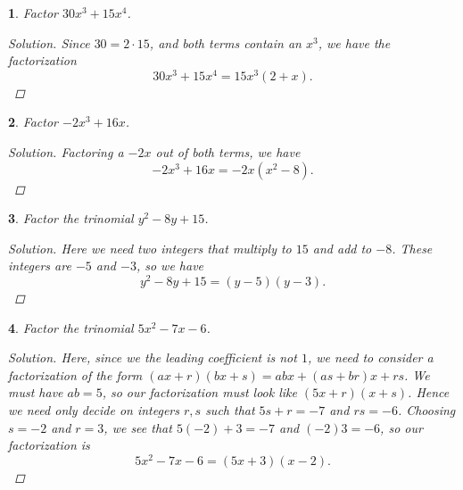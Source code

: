 \documentclass[12pt]{amsart}
\newtheorem{thm}{}
\begin{document}
\setcounter{thm}{6}
\begin{thm}
  Factor $30x^3 + 15x^4$.
  
  \begin{proof}[Solution]
    Since $30 = 2\cdot 15$, and both terms contain an $x^3$, we have the factorization
    $$30x^3 + 15x^4 = 15x^3(2 + x).$$
  \end{proof}
\end{thm}

\setcounter{thm}{8}
\begin{thm}
  Factor $-2x^3 + 16x$.
  
  \begin{proof}[Solution]
    Factoring a $-2x$ out of both terms, we have
    $$-2x^3 + 16x = -2x(x^2 - 8).$$
  \end{proof}
\end{thm}

\setcounter{thm}{20}
\begin{thm}
  Factor the trinomial $y^2 - 8y + 15$.
  
  \begin{proof}[Solution]
    Here we need two integers that multiply to $15$ and add to $-8$.
    These integers are $-5$ and $-3$, so we have
    $$y^2 - 8y + 15 = (y - 5)(y - 3).$$
  \end{proof}
\end{thm}

\setcounter{thm}{24}
\begin{thm}
  Factor the trinomial $5x^2 - 7x - 6$.
  
  \begin{proof}[Solution]
    Here, since we the leading coefficient is not $1$, we need to consider a factorization of the form $(ax + r)(bx + s) = abx + (as + br)x + rs$.
    We must have $ab = 5$, so our factorization must look like $(5x + r)(x + s)$.
    Hence we need only decide on integers $r, s$ such that $5s + r = -7$ and $rs = -6$.
    Choosing $s = -2$ and $r = 3$, we see that $5(-2) + 3 = -7$ and $(-2)3 = -6$, so our factorization is
    $$5x^2 - 7x - 6 = (5x + 3)(x - 2).$$
  \end{proof}
\end{thm}
\end{document}
